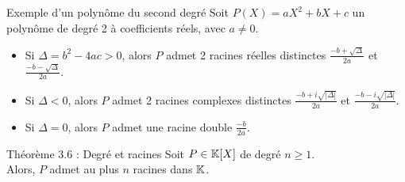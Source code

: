 \begin{theorem}[black]{Exemple d'un polynôme du second degré}
    Soit $P(X) = aX^2 + bX + c$ un polynôme de degré 2 à coefficients réels, avec $a \neq 0$.

    \begin{itemize}
        \item Si $\Delta = b^2 - 4ac > 0$, alors $P$ admet 2 racines réelles distinctes $\displaystyle \frac{-b + \sqrt{\Delta}}{2a}$ et $\displaystyle \frac{-b - \sqrt{\Delta}}{2a}$.
        \item Si $\Delta < 0$, alors $P$ admet 2 racines complexes distinctes $\displaystyle \frac{-b + i\sqrt{| \Delta |}}{2a}$ et $\displaystyle \frac{-b - i\sqrt{| \Delta |}}{2a}$.
        \item Si $\Delta = 0$, alors $P$ admet une racine double $\displaystyle \frac{-b}{2a}$.
    \end{itemize}
\end{theorem}

\begin{theorem}[orange]{Théorème 3.6 : Degré et racines}
    Soit $P \in \mathbb{K}[X]$ de degré $n \geq 1$. \\
    Alors, $P$ admet au plus $n$ racines dans $\mathbb{K}$.
\end{theorem}